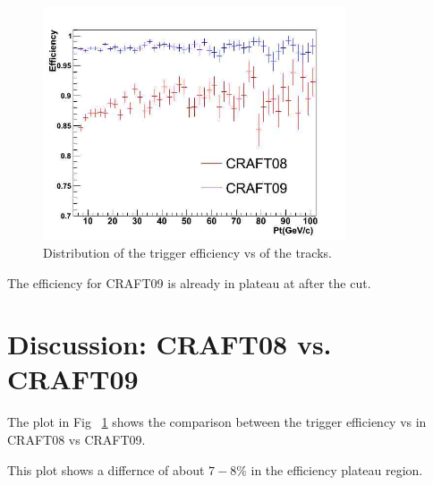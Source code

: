 \begin{figure}[hbtp]
  \begin{center}
    \includegraphics[width=0.8\textwidth]{eff_pt_09_vs_08}
    \hspace{1cm}
    \caption{Distribution of the trigger efficiency vs \pt of the tracks.}
    \label{fig:eff_pt_09_vs_08}
  \end{center}
\end{figure}


The efficiency for CRAFT09 is already in plateau at after the cut.%






\section{Discussion: CRAFT08 vs. CRAFT09}


The plot in Fig ~\ref{fig:eff_pt_09_vs_08} shows the comparison between 
the trigger efficiency vs \pt in CRAFT08 vs CRAFT09.



This plot shows a differnce of about $7-8 \% $  in the efficiency plateau region.

